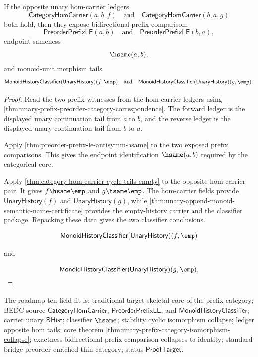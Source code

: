 \begin{theorem}
\label{thm:unary-prefix-category-isomorphism-collapse}
If the opposite unary hom-carrier ledgers
$$
\mathsf{CategoryHomCarrier}(a,b,f)
\quad\text{and}\quad
\mathsf{CategoryHomCarrier}(b,a,g)
$$
both hold, then they expose bidirectional prefix comparison,
$$
\mathsf{PreorderPrefixLE}(a,b)
\quad\text{and}\quad
\mathsf{PreorderPrefixLE}(b,a),
$$
endpoint sameness
$$
\hsame(a,b),
$$
and monoid-unit morphism tails
$$
\mathsf{MonoidHistoryClassifier}(\mathsf{UnaryHistory})(f,\emp)
\quad\text{and}\quad
\mathsf{MonoidHistoryClassifier}(\mathsf{UnaryHistory})(g,\emp).
$$
\end{theorem}
\begin{proof}
Read the two prefix witnesses from the hom-carrier ledgers using
\autoref{thm:unary-prefix-preorder-category-correspondence}. The forward ledger
is the displayed unary continuation tail from $a$ to $b$, and the reverse ledger
is the displayed unary continuation tail from $b$ to $a$.

Apply \autoref{thm:preorder-prefix-le-antisymm-hsame} to the two exposed prefix
comparisons. This gives the endpoint identification $\hsame(a,b)$ required by
the categorical core.

Apply \autoref{thm:category-hom-carrier-cycle-tails-empty} to the opposite
hom-carrier pair. It gives $f\hsame\emp$ and $g\hsame\emp$. The hom-carrier
fields provide $\mathsf{UnaryHistory}(f)$ and $\mathsf{UnaryHistory}(g)$, while
\autoref{thm:unary-append-monoid-semantic-name-certificate} provides the
empty-history carrier and the classifier package. Repacking these data gives the
two classifier conclusions.

$$
\mathsf{MonoidHistoryClassifier}(\mathsf{UnaryHistory})(f,\emp)
$$

and

$$
\mathsf{MonoidHistoryClassifier}(\mathsf{UnaryHistory})(g,\emp).
$$

\end{proof}

The roadmap ten-field fit is: traditional target skeletal core of the prefix
category; BEDC source $\mathsf{CategoryHomCarrier}$,
$\mathsf{PreorderPrefixLE}$, and
$\mathsf{MonoidHistoryClassifier}$; carrier unary $\mathsf{BHist}$; classifier
$\hsame$; stability cyclic isomorphism collapse; ledger opposite hom tails; core
theorem \autoref{thm:unary-prefix-category-isomorphism-collapse}; exactness
bidirectional prefix comparison collapses to identity; standard bridge
preorder-enriched thin category; status $\mathsf{ProofTarget}$.

